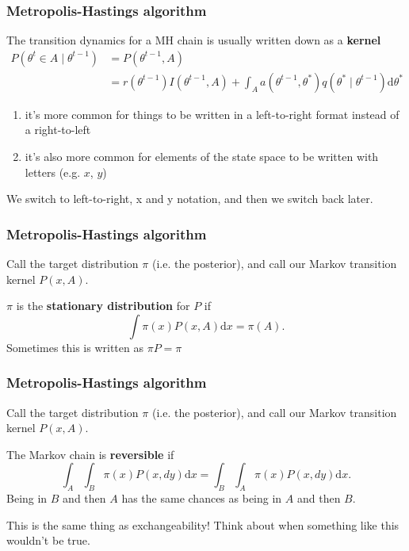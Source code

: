 \documentclass{beamer}
\begin{document}
\begin{frame}
\frametitle{Metropolis-Hastings algorithm}

The transition dynamics for a MH chain is usually written down as a {\bf kernel} 
\begin{align*}
P(\theta^t \in A \mid \theta^{t-1}) &= P(\theta^{t-1}, A) \\
&= r(\theta^{t-1})I(\theta^{t-1}, A) + \int_A a(\theta^{t-1}, \theta^*)q(\theta^* \mid \theta^{t-1}) \text{d}\theta^*
\end{align*}

\begin{enumerate}
\item it's more common for things to be written in a left-to-right format instead of a right-to-left
\item it's also more common for elements of the state space to be written with letters (e.g. $x$, $y$)
\end{enumerate}
We switch to left-to-right, x and y notation, and then we switch back later.



\end{frame}

\begin{frame}
\frametitle{Metropolis-Hastings algorithm}

Call the target distribution $\pi$ (i.e. the posterior), and call our Markov transition kernel $P(x, A)$.
\newline

$\pi$ is the {\bf stationary distribution} for $P$ if
$$
\int \pi(x) P(x, A) \text{d}x = \pi(A).
$$
Sometimes this is written as $\pi P = \pi$




\end{frame}

\begin{frame}
\frametitle{Metropolis-Hastings algorithm}

Call the target distribution $\pi$ (i.e. the posterior), and call our Markov transition kernel $P(x, A)$.
\newline

The Markov chain is {\bf reversible} if
$$
\int_A\int_B \pi(x) P(x, dy) \text{d}x = \int_B\int_A \pi(x) P(x, dy) \text{d}x.
$$
Being in $B$ and then $A$ has the same chances as being in $A$ and then $B$. 
\newline

This is the same thing as exchangeability! Think about when something like this wouldn't be true.

\end{frame}
\end{document}
